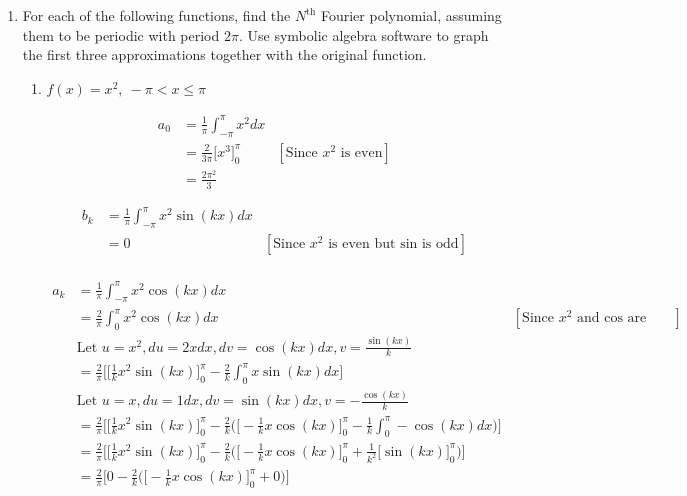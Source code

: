 \documentclass{article}
\begin{document}
\begin{enumerate}
    \item For each of the following functions, find the $N^{\text{th}}$ Fourier polynomial, assuming them to be periodic with period $2\pi$. Use symbolic algebra software to graph the first three approximations together with the original function.
    \begin{enumerate}
        \item $f(x) = x^2 , \ -\pi < x \leq \pi$
        \begin{multicols}{2}
        \begin{align*}
            a_0 &= \frac{1}{\pi}\int_{-\pi}^\pi x^2 dx \\
            &= \frac{2}{3\pi} \Big[x^3\Big]^\pi_0 &[\text{Since $x^2$ is even}]\\
            &= \frac{2\pi^2}{3} \\
        \end{align*}
        \begin{align*}
        \\
            b_k &= \frac{1}{\pi}\int_{-\pi}^\pi x^2\sin(kx) dx \\
            &= 0 &[\text{Since $x^2$ is even but sin is odd}]\\ 
        \end{align*}
        \end{multicols}
        \begin{align*}
            a_k &= \frac{1}{\pi}\int_{-\pi}^\pi x^2\cos(kx) dx \\
            &= \frac{2}{\pi}\int_{0}^\pi x^2\cos(kx) dx &[\text{Since $x^2$ and cos are even}]\\ 
			&\text{Let $u = x^2, du = 2xdx, dv = \cos(kx) dx, v = \frac{\sin(kx)}{k}$} \\
            &= \frac{2}{\pi}\Bigg[\Big[\frac{1}{k}x^2\sin(kx)\Big]^{\pi}_{0} - \frac{2}{k}\int_{0}^\pi x\sin(kx) dx \Bigg] \\
			&\text{Let $u = x, du = 1 dx, dv = \sin(kx) dx, v = -\frac{\cos(kx)}{k}$} \\
            &= \frac{2}{\pi}\Bigg[\Big[\frac{1}{k}x^2\sin(kx)\Big]^{\pi}_{0} - \frac{2}{k} \Big( \Big[ -\frac{1}{k}x\cos(kx)\Big]^\pi_0 - \frac{1}{k} \int^\pi_0 -\cos(kx) dx \Big) \Bigg] \\
            &= \frac{2}{\pi}\Bigg[\Big[\frac{1}{k}x^2\sin(kx)\Big]^{\pi}_{0} - \frac{2}{k} \Big( \Big[ -\frac{1}{k}x\cos(kx)\Big]^\pi_0 + \frac{1}{k^2} \Big[\sin(kx)\Big]^\pi_0 \Big) \Bigg] \\
            &= \frac{2}{\pi}\Bigg[0 - \frac{2}{k} \Big( \Big[ -\frac{1}{k}x\cos(kx)\Big]^\pi_0 + 0 \Big) \Bigg] \\

\end{align*}
\end{enumerate}
\end{enumerate}
\end{document}
